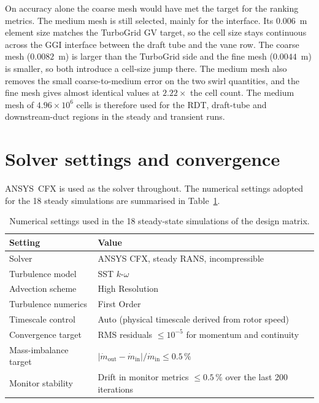 On accuracy alone the coarse mesh would have met the target for the ranking metrics. The medium mesh is still selected, mainly for the interface. Its $0.006$~m element size matches the TurboGrid GV target, so the cell size stays continuous across the GGI interface between the draft tube and the vane row. The coarse mesh ($0.0082$~m) is larger than the TurboGrid side and the fine mesh ($0.0044$~m) is smaller, so both introduce a cell-size jump there. The medium mesh also removes the small coarse-to-medium error on the two swirl quantities, and the fine mesh gives almost identical values at $2.22\times$ the cell count. The medium mesh of $4.96\times10^{6}$ cells is therefore used for the RDT, draft-tube and downstream-duct regions in the steady and transient runs.

\section{Solver settings and convergence}
\label{sec:methods_solver}
 
ANSYS~CFX is used as the solver throughout. The numerical settings adopted for the 18 steady simulations are summarised in Table~\ref{tab:cfx_settings_master}.
 
\begin{table}[h!]
  \centering
  \caption[Solver settings]{Numerical settings used in the 18 steady-state simulations of the design matrix.}
  \label{tab:cfx_settings_master}
  \small
  \begin{tabular}{l l}
    \toprule
    \textbf{Setting} & \textbf{Value} \\
    \midrule
    Solver                       & ANSYS CFX, steady RANS, incompressible \\
    Turbulence model             & SST $k$-$\omega$ \\
    Advection scheme             & High Resolution \\
    Turbulence numerics          & First Order\\
    Timescale control            & Auto (physical timescale derived from rotor speed) \\
    Convergence target           & RMS residuals $\leq 10^{-5}$ for momentum and continuity \\
    Mass-imbalance target        & $|\dot m_{\mathrm{out}} - \dot m_{\mathrm{in}}|/\dot m_{\mathrm{in}} \leq 0.5\,\%$ \\
    Monitor stability            & Drift in monitor metrics $\leq 0.5\,\%$ over the last 200 iterations \\
    \bottomrule
  \end{tabular}
\end{table}
 
